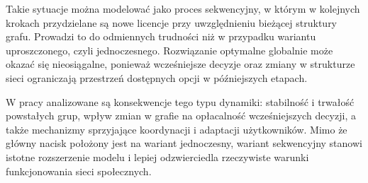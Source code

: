 Takie sytuacje można modelować jako proces sekwencyjny, w którym w kolejnych krokach przydzielane są nowe licencje przy uwzględnieniu bieżącej struktury grafu. Prowadzi to do odmiennych trudności niż w przypadku wariantu uproszczonego, czyli jednoczesnego. Rozwiązanie optymalne globalnie może okazać się nieosiągalne, ponieważ wcześniejsze decyzje oraz zmiany w strukturze sieci ograniczają przestrzeń dostępnych opcji w późniejszych etapach.

W pracy analizowane są konsekwencje tego typu dynamiki: stabilność i trwałość powstałych grup, wpływ zmian w grafie na opłacalność wcześniejszych decyzji, a także mechanizmy sprzyjające koordynacji i adaptacji użytkowników. Mimo że główny nacisk położony jest na wariant jednoczesny, wariant sekwencyjny stanowi istotne rozszerzenie modelu i lepiej odzwierciedla rzeczywiste warunki funkcjonowania sieci społecznych.
